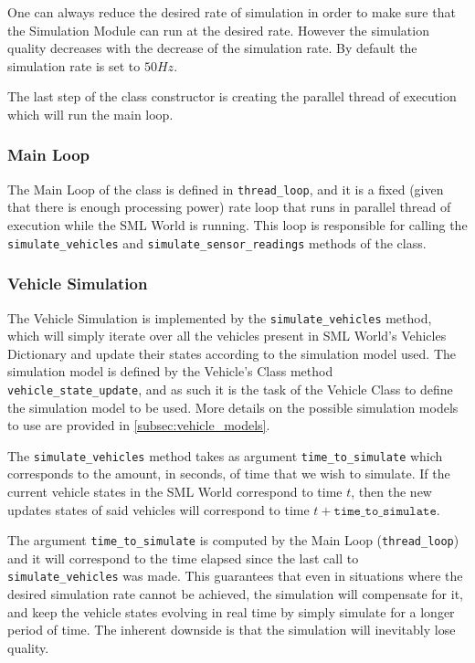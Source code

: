 One can always reduce the desired rate of simulation in order to make sure that the Simulation Module can run at the desired rate. However the simulation quality decreases with the decrease of the simulation rate. By default the simulation rate is set to $50 Hz$.

The last step of the class constructor is creating the parallel thread of execution which will run the main loop.

\subsubsection{Main Loop}

The Main Loop of the class is defined in \texttt{thread\_loop}, and it is a fixed (given that there is enough processing power) rate loop that runs in parallel thread of execution while the SML World is running. This loop is responsible for calling the \texttt{simulate\_vehicles} and \texttt{simulate\_sensor\_readings} methods of the class.

\subsubsection{Vehicle Simulation}

The Vehicle Simulation is implemented by the \texttt{simulate\_vehicles} method, which will simply iterate over all the vehicles present in SML World's Vehicles Dictionary and update their states according to the simulation model used. The simulation model is defined by the Vehicle's Class method \texttt{vehicle\_state\_update}, and as such it is the task of the Vehicle Class to define the simulation model to be used. More details on the possible simulation models to use are provided in \ref{subsec:vehicle_models}.

The \texttt{simulate\_vehicles} method takes as argument \texttt{time\_to\_simulate} which corresponds to the amount, in seconds, of time that we wish to simulate. If the current vehicle states in the SML World correspond to time $t$, then the new updates states of said vehicles will correspond to time $t+\texttt{time\_to\_simulate}$.

The argument \texttt{time\_to\_simulate} is computed by the Main Loop (\texttt{thread\_loop}) and it will correspond to the time elapsed since the last call to \texttt{simulate\_vehicles} was made. This guarantees that even in situations where the desired simulation rate cannot be achieved, the simulation will compensate for it, and keep the vehicle states evolving in real time by simply simulate for a longer period of time. The inherent downside is that the simulation will inevitably lose quality. 


